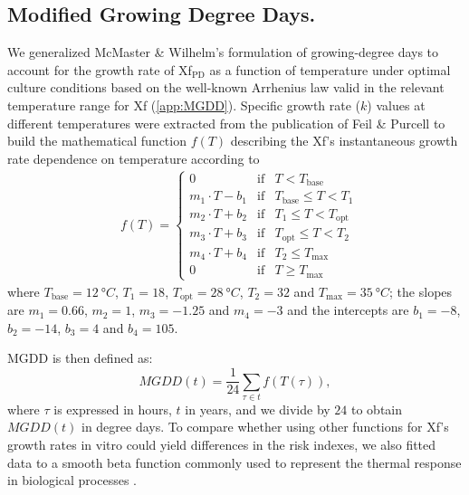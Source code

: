 \subsection{Modified Growing Degree Days.}

We generalized McMaster \& Wilhelm’s \cite{McMaster1997} formulation of
growing-degree days to account for the growth rate of Xf$_{\textrm{PD}}$ as a
function of temperature under optimal culture conditions based on the
well-known Arrhenius law valid in the relevant temperature range for Xf
(\cref{app:MGDD}). Specific growth rate ($k$) values at different temperatures
were extracted from the publication of Feil \& Purcell \cite{Feil2001} to build
the mathematical function $f(T)$ describing the Xf’s instantaneous growth rate
dependence on temperature according to
\begin{align*}
     & f(T)=\left\{\begin{array}{lll}
                       0                & \textrm{if} & T<T_{\textrm{base}}
                       \\
                       m_1\cdot T-b_1   & \textrm{if} & T_{\textrm{base}}
                       \leq T < T_1
                       \\
                       m_2\cdot T + b_2 & \textrm{if} & T_{1} \leq T <
                       T_{\textrm{opt}}
                       \\
                       m_3\cdot T + b_3 & \textrm{if} & T_{\textrm{opt}}
                       \leq T < T_2
                       \\
                       m_4\cdot T + b_4 & \textrm{if} & T_2 \leq
                       T_{\textrm{max}}
                       \\
                       0                & \textrm{if} & T\geq
                       T_{\textrm{max}}
                   \end{array}\right. \,
\end{align*}
where $T_{\textrm{base}}=\SI{12}{\degree C}$, $T_1=18$,
$T_{\textrm{opt}}=\SI{28}{\degree C}$,	$T_2=32$ and
$T_{\textrm{max}}=\SI{35}{\degree C}$; the slopes are $m_1= 0.66$, $m_2=1$,
$m_3=-1.25$ and $m_4=-3$ and the intercepts are $b_1=-8$, $b_2=-14$, $b_3=4$
and $b_4=105$.

MGDD is then defined as:
\begin{equation}\label{eq:MGDD_def}
    MGDD(t) = \frac{1}{24}\sum_{\tau \in t} f(T(\tau)),
\end{equation}
where $\tau$ is expressed in hours, $t$ in years, and we divide by $24$ to
obtain $MGDD(t)$ in degree days. To compare whether using other functions
for Xf's growth rates in vitro could yield differences in the risk indexes, we
also fitted data to a smooth beta function commonly used to represent the
thermal response in biological processes \cite{Yan1999,Magarey2005}.

